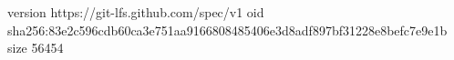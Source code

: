 version https://git-lfs.github.com/spec/v1
oid sha256:83e2c596cdb60ca3e751aa9166808485406e3d8adf897bf31228e8befc7e9e1b
size 56454
